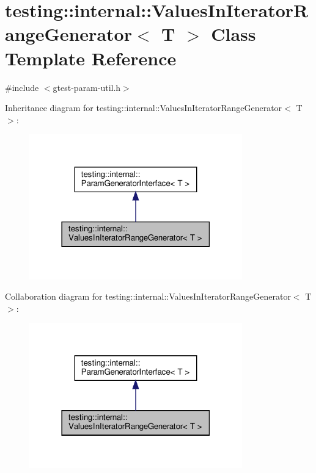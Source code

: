 \hypertarget{classtesting_1_1internal_1_1ValuesInIteratorRangeGenerator}{}\section{testing\+:\+:internal\+:\+:Values\+In\+Iterator\+Range\+Generator$<$ T $>$ Class Template Reference}
\label{classtesting_1_1internal_1_1ValuesInIteratorRangeGenerator}


{\ttfamily \#include $<$gtest-\/param-\/util.\+h$>$}



Inheritance diagram for testing\+:\+:internal\+:\+:Values\+In\+Iterator\+Range\+Generator$<$ T $>$\+:\nopagebreak
\begin{figure}[H]
\begin{center}
\leavevmode
\includegraphics[width=261pt]{classtesting_1_1internal_1_1ValuesInIteratorRangeGenerator__inherit__graph}
\end{center}
\end{figure}


Collaboration diagram for testing\+:\+:internal\+:\+:Values\+In\+Iterator\+Range\+Generator$<$ T $>$\+:\nopagebreak
\begin{figure}[H]
\begin{center}
\leavevmode
\includegraphics[width=261pt]{classtesting_1_1internal_1_1ValuesInIteratorRangeGenerator__coll__graph}
\end{center}
\end{figure}
